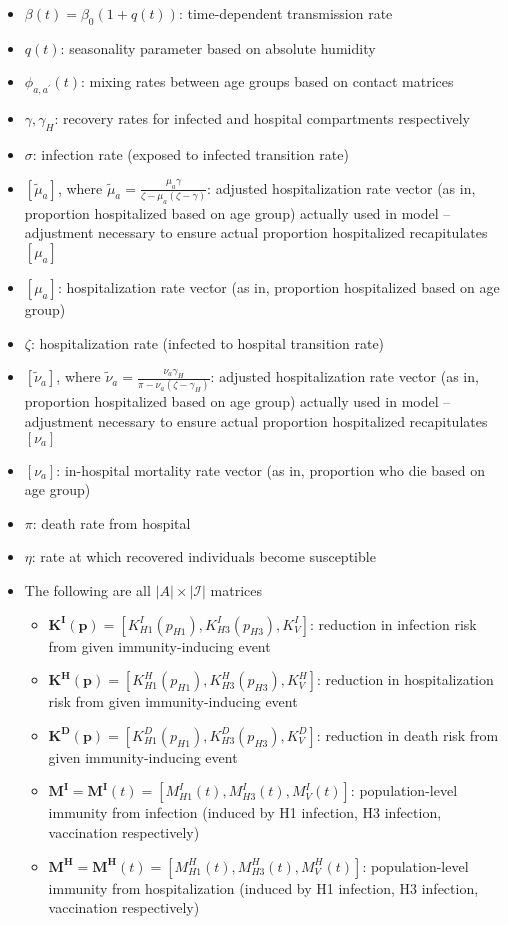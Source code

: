 \documentclass[11pt]{article}
\begin{document}
\begin{itemize}
\item $\beta(t) = \beta_0 (1 + q(t))$: time-dependent transmission rate
\item $q(t)$: seasonality parameter based on absolute humidity
\item $\phi_{a, a^\prime}(t)$: mixing rates between age groups based on contact matrices
\item $\gamma, \gamma_H$: recovery rates for infected and hospital compartments respectively
\item $\sigma$: infection rate (exposed to infected transition rate)
\item $[\tilde{\mu}_a]$, where $\tilde{\mu}_a = \frac{\mu_a\gamma}{\zeta - \mu_a(\zeta-\gamma)}$: adjusted hospitalization rate vector (as in, proportion hospitalized based on age group) actually used in model -- adjustment necessary to ensure actual proportion hospitalized recapitulates $[\mu_a]$
\item $[\mu_a]$: hospitalization rate vector (as in, proportion hospitalized based on age group)
\item $\zeta$: hospitalization rate (infected to hospital transition rate)
\item$[\tilde{\nu}_a]$, where $\tilde{\nu}_a = \frac{\nu_a\gamma_H}{\pi - \nu_a(\zeta-\gamma_H)}$: adjusted hospitalization rate vector (as in, proportion hospitalized based on age group) actually used in model -- adjustment necessary to ensure actual proportion hospitalized recapitulates $[\nu_a]$
\item $[\nu_a]$: in-hospital mortality rate vector (as in, proportion who die based on age group)
\item $\pi$: death rate from hospital
\item $\eta$: rate at which recovered individuals become susceptible
\item The following are all $\lvert A \rvert \times \lvert \mathcal I \rvert$ matrices
\begin{itemize}
\item $\boldsymbol{K^I(p)} = [K^I_{H1}(p_{H1}), K^I_{H3}(p_{H3}), K^I_{V}]$: reduction in infection risk from given immunity-inducing event
\item $\boldsymbol{K^H(p)} = [K^H_{H1}(p_{H1}), K^H_{H3}(p_{H3}), K^H_{V}]$: reduction in hospitalization risk from given immunity-inducing event
\item $\boldsymbol{K^D(p)} = [K^D_{H1}(p_{H1}), K^D_{H3}(p_{H3}), K^D_{V}]$: reduction in death risk from given immunity-inducing event
\item $\boldsymbol{M^I} = \boldsymbol{M^I}(t) = [M^I_{H1}(t), M^I_{H3}(t), M^I_{V}(t)]$: population-level immunity from infection (induced by H1 infection, H3 infection, vaccination respectively)
\item $\boldsymbol{M^H} = \boldsymbol{M^H}(t) = [M^H_{H1}(t), M^H_{H3}(t), M^H_{V}(t)]$: population-level immunity from hospitalization (induced by H1 infection, H3 infection, vaccination respectively)
\end{itemize}
\end{itemize}
\end{document}
